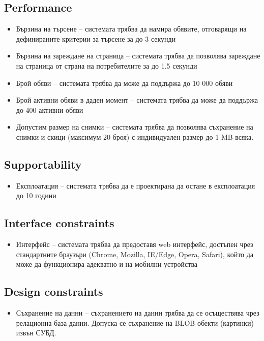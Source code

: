 \documentclass[a4paper]{article}
\begin{document}
\subsection{Performance}
\begin{itemize}
\item Бързина на търсене -- системата трябва да намира обявите, отговарящи на дефинираните критерии за търсене за до 3 секунди
\item Бързина на зареждане на страница -- системата трябва да позволява зареждане на страница от страна на потребителите за до 1.5 секунди
\item Брой обяви -- системата трябва да може да поддържа до 10 000 обяви
\item Брой активни обяви в даден момент -- системата трябва да може да поддържа до 400 активни обяви
\item Допустим размер на снимки -- системата трябва да позволява съхранение на снимки и скици (максимум 20 броя) с индивидуален размер до 1 MB всяка.
\end{itemize}

\subsection{Supportability}
\begin{itemize}
\item Експлоатация -- системата трябва да е проектирана да остане в експлоатация до 10 години
\end{itemize}

\subsection{Interface constraints}
\begin{itemize}
\item Интерфейс -- системата трябва да предоставя web интерфейс, достъпен чрез стандартните браузъри (Chrome, Mozilla, IE/Edge, Opera, Safari), който да може да функционира адекватно и на мобилни устройства
\end{itemize}

\subsection{Design constraints}
\begin{itemize}
\item Съхранение на данни -- съхранението на данни трябва да се осъществява чрез релационна база данни. Допуска се съхранение на BLOB обекти (картинки) извън СУБД.
\end{itemize}
\end{document}
